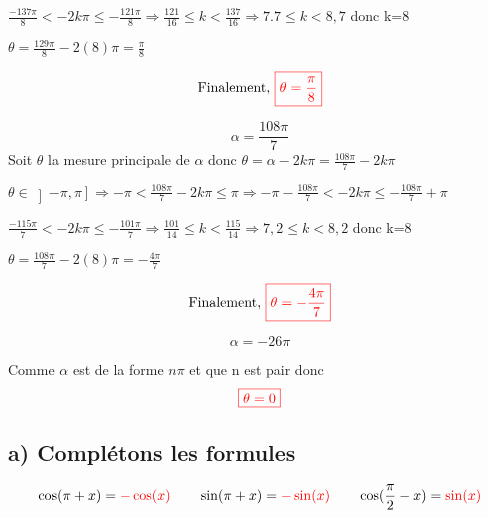 \documentclass[12pt]{article}
\begin{document}
$\frac{-137\pi}{8}<-2k\pi\leq-\frac{121\pi}{8} \Rightarrow \frac{121}{16}\leq k <\frac{137}{16} \Rightarrow 7.7\leq k <8,7  $ donc k=8

$\theta=\frac{129\pi}{8}-2(8)\pi=\frac{\pi}{8}$ 

\[\text{Finalement, }\textcolor{red}{\boxed{\theta=\frac{\pi}{8}}}\] 

\[\alpha =\frac{108\pi}{7} \]
Soit $\theta$ la mesure principale de $\alpha$ donc $\theta=\alpha-2k\pi=\frac{108\pi}{7}-2k\pi$ 

$\theta \in \left]-\pi, \pi\right]\Rightarrow -\pi<\frac{108\pi}{7}-2k\pi\leq \pi \Rightarrow -\pi-\frac{108\pi}{7}<-2k\pi\leq-\frac{108\pi}{7}+\pi$ 

$\frac{-115\pi}{7}<-2k\pi\leq-\frac{101\pi}{7} \Rightarrow \frac{101}{14}\leq k <\frac{115}{14} \Rightarrow 7,2\leq k <8,2  $ donc k=8

$\theta=\frac{108\pi}{7}-2(8)\pi=-\frac{4\pi}{7}$ 

\[\text{Finalement, }\textcolor{red}{\boxed{\theta=-\frac{4\pi}{7}}}\]

\[\alpha =-26\pi\]

Comme $\alpha$ est de la forme $n\pi$ et que n est pair donc  \[\textcolor{red}{\boxed{\theta=0}}\]
\subsection*{a) Complétons les formules}
\[\cos(\pi+x)=\textcolor{red}{-\cos(x)}\quad\quad \sin(\pi+x)=\textcolor{red}{-\sin(x)}\quad\quad \cos(\frac{\pi}{2}-x)=\textcolor{red}{\sin(x)}\]
\end{document}
